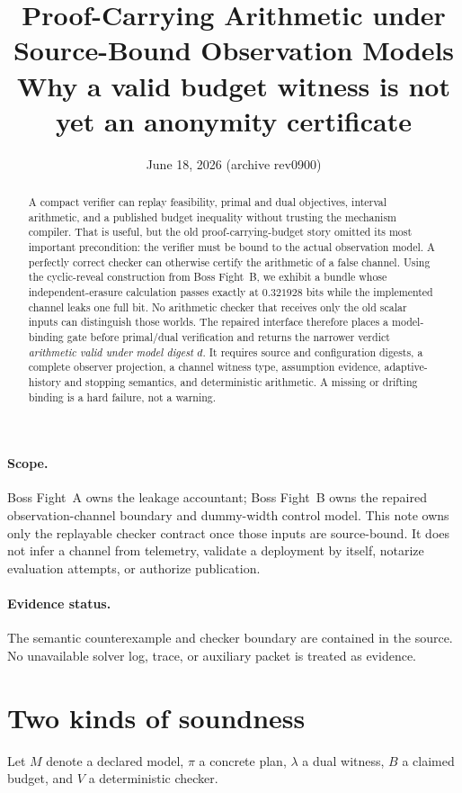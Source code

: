 \documentclass[11pt]{article}
\title{Proof-Carrying Arithmetic under Source-Bound Observation Models\\
\large Why a valid budget witness is not yet an anonymity certificate}
\author{}
\date{June 18, 2026 (archive rev0900)}
\begin{document}
\maketitle

\begin{abstract}
A compact verifier can replay feasibility, primal and dual objectives, interval arithmetic, and a published budget inequality without trusting the mechanism compiler. That is useful, but the old proof-carrying-budget story omitted its most important precondition: the verifier must be bound to the actual observation model.
A perfectly correct checker can otherwise certify the arithmetic of a false channel.
Using the cyclic-reveal construction from Boss Fight~B, we exhibit a bundle whose independent-erasure calculation passes exactly at \(0.321928\) bits while the implemented channel leaks one full bit.
No arithmetic checker that receives only the old scalar inputs can distinguish those worlds.
The repaired interface therefore places a model-binding gate before primal/dual verification and returns the narrower verdict \emph{arithmetic valid under model digest \(d\)}. It requires source and configuration digests, a complete observer projection, a channel witness type, assumption evidence, adaptive-history and stopping semantics, and deterministic arithmetic. A missing or drifting binding is a hard failure, not a warning.
\end{abstract}

\paragraph{Scope.}
Boss Fight~A owns the leakage accountant; Boss Fight~B owns the repaired observation-channel boundary and dummy-width control model. This note owns only the replayable checker contract once those inputs are source-bound. It does not infer a channel from telemetry, validate a deployment by itself, notarize evaluation attempts, or authorize publication.\cite{series:bossfighta,series:bossfightb,series:evalnotary,series:abomoinl,series:releaseproperty}

\paragraph{Evidence status.}
The semantic counterexample and checker boundary are contained in the source. No unavailable solver log, trace, or auxiliary packet is treated as evidence.

\section{Two kinds of soundness}\label{sec:soundness}
Let \(M\) denote a declared model, \(\pi\) a concrete plan, \(\lambda\) a dual witness, \(B\) a claimed budget, and \(V\) a deterministic checker.
\end{document}

